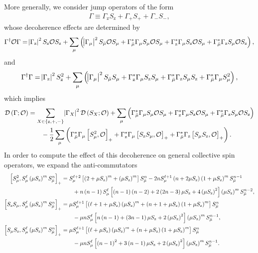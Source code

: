 \documentclass[pra,reprint,longbibliography]{revtex4-1}
\newcommand{\f}[2]{\dfrac{#1}{#2}} %
\newcommand{\p}[1]{\left(#1\right)} %
\renewcommand{\sp}[1]{\left[#1\right]} %
\renewcommand{\set}[1]{\left\{#1\right\}} %
\newcommand{\D}{\mathcal{D}}
\renewcommand{\O}{\mathcal{O}}
\newcommand{\z}{\text{z}}
\newcommand{\bmu}{{\bar\mu}}
\newcommand{\1}{\mathds{1}}
\begin{document}
More generally, we consider jump operators of the form
\begin{align}
  \Gamma \equiv \Gamma_\z S_\z + \Gamma_+ S_+ + \Gamma_- S_-,
\end{align}
whose decoherence effects are determined by
\begin{align}
  \Gamma^\dag \O \Gamma
  = \abs{\Gamma_\z}^2 S_\z \O S_\z
  + \sum_\mu \p{\abs{\Gamma_\mu}^2 S_\bmu \O S_\mu
    + \Gamma_\bmu^* \Gamma_\mu S_\mu \O S_\mu
    + \Gamma_\z^* \Gamma_\mu S_\z \O S_\mu
    + \Gamma_\bmu^* \Gamma_\z S_\mu \O S_\z},
\end{align}
and
\begin{align}
  \Gamma^\dag \Gamma
  = \abs{\Gamma_\z}^2 S_\z^2
  + \sum_\mu \p{\abs{\Gamma_\mu}^2 S_\bmu S_\mu
    + \Gamma_\z^*\Gamma_\mu S_\z S_\mu
    + \Gamma_\bmu^* \Gamma_\z S_\mu S_\z
    + \Gamma_\bmu^* \Gamma_\mu S_\mu^2},
\end{align}
which implies
\begin{align}
  \D\p{\Gamma;\O}
  &= \sum_{X\in\set{\z,+,-}} \abs{\Gamma_X}^2 \D\p{S_X;\O}
  + \sum_\mu \p{\Gamma_\bmu^* \Gamma_\mu S_\mu \O S_\mu
    + \Gamma_\z^* \Gamma_\mu S_\z \O S_\mu
    + \Gamma_\bmu^* \Gamma_\z S_\mu \O S_\z}
  \notag \\
  &\qquad -\f12 \sum_\mu\p{\Gamma_\bmu^* \Gamma_\mu \sp{S_\mu^2, \O}_+
    + \Gamma_\z^*\Gamma_\mu \sp{S_\z S_\mu, \O}_+
    + \Gamma_\bmu^* \Gamma_\z \sp{S_\mu S_\z, \O}_+}.
\end{align}
In order to compute the effect of this decoherence on general
collective spin operators, we expand the anti-commutators
\begin{align}
  \sp{S_\mu^2, S_\mu^\ell \p{\mu S_\z}^m S_\bmu^n}_+
  &= S_\mu^{\ell+2} \sp{\p{2+\mu S_\z}^m+\p{\mu S_\z}^m} S_\bmu^n
  - 2n S_\mu^{\ell+1} \p{n+2\mu S_\z} \p{1+\mu S_\z}^m S_\bmu^{n-1}
  \notag \\
  &\qquad + n\p{n-1} S_\mu^\ell \sp{\p{n-1}\p{n-2}
    + 2\p{2n-3}\mu S_\z + 4\p{\mu S_\z}^2} \p{\mu S_\z}^m S_\bmu^{n-2},
  \allowdisplaybreaks \\
  \sp{S_\z S_\mu, S_\mu^\ell \p{\mu S_\z}^m S_\bmu^n}_+
  &= \mu S_\mu^{\ell+1} \sp{\p{\ell+1+\mu S_\z}\p{\mu S_\z}^m
    + \p{n+1+\mu S_\z} \p{1+\mu S_\z}^m } S_\bmu^n \notag \\
  &\qquad - \mu n S_\mu^\ell \sp{n \p{n-1}
    + \p{3n-1}\mu S_\z + 2\p{\mu S_\z}^2} \p{\mu S_\z}^m S_\bmu^{n-1},
  \allowdisplaybreaks \\
  \sp{S_\mu S_\z, S_\mu^\ell \p{\mu S_\z}^m S_\bmu^n}_+
  &= \mu S_\mu^{\ell+1} \sp{\p{\ell+\mu S_\z}\p{\mu S_\z}^m
    + \p{n+\mu S_\z} \p{1+\mu S_\z}^m} S_\bmu^n \notag \\
  &\qquad - \mu n S_\mu^\ell \sp{\p{n-1}^2
    + 3\p{n-1}\mu S_\z + 2\p{\mu S_\z}^2} \p{\mu S_\z}^m S_\bmu^{n-1}.
\end{align}
\end{document}
